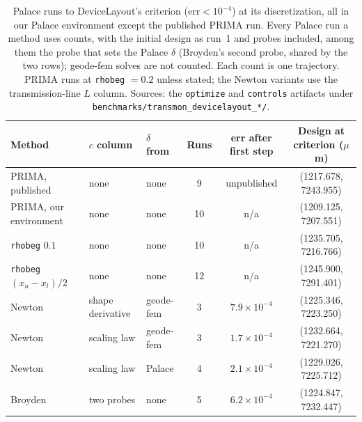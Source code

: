 \documentclass{anvil-paper}
\begin{document}
\begin{table}[htbp]
  \centering
  \caption{Palace runs to DeviceLayout's criterion ($\mathrm{err} <
  10^{-4}$) at its discretization, all in our Palace environment except the
  published PRIMA run. Every Palace run a method uses counts, with the
  initial design as run~1 and probes included, among them the probe that
  sets the Palace $\delta$ (Broyden's second probe, shared by the two
  rows); geode-fem solves are not counted. Each count is one trajectory.
  PRIMA runs at \texttt{rhobeg} $= 0.2$ unless stated; the Newton variants
  use the transmission-line $L$ column.
  Sources: the \texttt{optimize} and \texttt{controls} artifacts under
  \texttt{benchmarks/transmon\_devicelayout\_*/}.}
  \label{tab:controls}
  \footnotesize
  \begin{tabular}{@{}lllccc@{}}
    \toprule
    Method & $c$ column & $\delta$ from & Runs & err after first step & Design at criterion ($\mu$m) \\
    \midrule
    PRIMA, published & none & none & 9 & unpublished & (1217.678, 7243.955) \\
    PRIMA, our environment & none & none & 10 & n/a & (1209.125, 7207.551) \\
    \quad \texttt{rhobeg} $0.1$ & none & none & 10 & n/a & (1235.705, 7216.766) \\
    \quad \texttt{rhobeg} $(x_u - x_l)/2$ & none & none & 12 & n/a & (1245.900, 7291.401) \\
    Newton & shape derivative & geode-fem & 3 & $7.9\times10^{-4}$ & (1225.346, 7223.250) \\
    Newton & scaling law & geode-fem & 3 & $1.7\times10^{-4}$ & (1232.664, 7221.270) \\
    Newton & scaling law & Palace & 4 & $2.1\times10^{-4}$ & (1229.026, 7225.712) \\
    Broyden & two probes & none & 5 & $6.2\times10^{-4}$ & (1224.847, 7232.447) \\
    \bottomrule
  \end{tabular}
\end{table}
\end{document}
